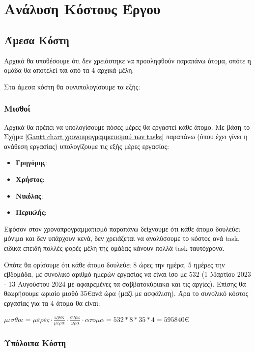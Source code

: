 \documentclass[12pt,a4paper]{article}
\begin{document}
\section{Ανάλυση Κόστους Έργου}

\subsection{Άμεσα Κόστη}

Αρχικά θα υποθέσουμε ότι δεν χρειάστηκε να προσληφθούν παραπάνω άτομα, οπότε η ομάδα θα αποτελεί ται από τα 4 αρχικά μέλη.

Στα άμεσα κόστη θα συνυπολογίσουμε τα εξής:

\subsubsection{Μισθοί}
Αρχικά θα πρέπει να υπολογίσουμε πόσες μέρες θα εργαστεί κάθε άτομο. Με βάση το Σχήμα \ref{Gantt chart χρονοπρογραμματισμού των tasks} παραπάνω (όπου έχει γίνει η ανάθεση εργασίας) υπολογίζουμε τις εξής μέρες εργασίας:

\begin{itemize}
    \item \textbf{Γρηγόρης}:
    \item \textbf{Χρήστος}:
    \item \textbf{Νικόλας}:
    \item \textbf{Περικλής}:
\end{itemize}

Εφόσον στον χρονοπρογραμματισμό παραπάνω δείχνουμε ότι κάθε άτομο δουλεύει μόνιμα και δεν υπάρχουν κενά, δεν χρειάζεται να αναλύσουμε το κόστος ανά task, ειδικά επειδή πολλές φορές μέλη της ομάδας κάνουν πολλά task ταυτόχρονα.

Οπότε θα ορίσουμε ότι κάθε άτομο δουλεύει 8 ώρες την ημέρα, 5 ημέρες την εβδομάδα, με συνολικό αριθμό ημερών εργασίας να είναι ίσο με 532 (1 Μαρτίου 2023 - 13 Αυγούστου 2024 με αφαιρεμένες τα σαββατοκύριακα και τις αργίες). Επίσης θα θεωρήσουμε ωριαίο μισθό 35\euro\space ανά ώρα (μαζί με ασφάλιση). Άρα το συνολικό κόστος εργασίας για τα 4 άτομα θα είναι:

$μισθοι = μερες \cdot \frac{ωρες}{μερα} \cdot \frac{ευρω}{ωρα} \cdot ατομα = 532 * 8 * 35 * 4 = 595840\euro$

\subsubsection{Υπόλοιπα Κόστη}
\end{document}
